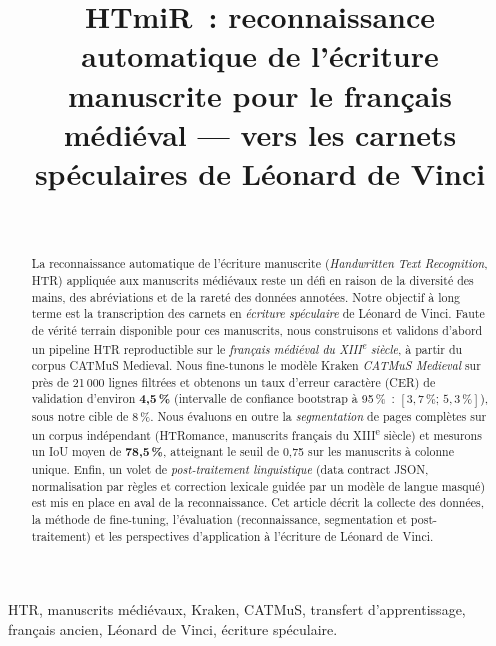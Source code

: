 \documentclass[10pt,journal,a4paper]{IEEEtran}
\begin{document}
\title{HTmiR~: reconnaissance automatique de l'écriture manuscrite pour
le français médiéval --- vers les carnets spéculaires de Léonard de Vinci}

\author{%
\\
%
}

\maketitle

\begin{abstract}
La reconnaissance automatique de l'écriture manuscrite (\textit{Handwritten
Text Recognition}, HTR) appliquée aux manuscrits médiévaux reste un défi en
raison de la diversité des mains, des abréviations et de la rareté des données
annotées. Notre objectif à long terme est la transcription des carnets en
\emph{écriture spéculaire} de Léonard de Vinci. Faute de vérité terrain
disponible pour ces manuscrits, nous construisons et validons d'abord un
pipeline HTR reproductible sur le \emph{français médiéval du
XIII\textsuperscript{e} siècle}, à partir du corpus CATMuS Medieval. Nous
fine-tunons le modèle Kraken \textit{CATMuS Medieval} sur près de 21\,000 lignes
filtrées et obtenons un taux d'erreur caractère (CER) de validation d'environ
\textbf{4,5\,\%} (intervalle de confiance bootstrap à 95\,\%~:
$[3,7\,\%;\,5,3\,\%]$), sous notre cible de 8\,\%. Nous évaluons en outre la
\emph{segmentation} de pages complètes sur un corpus indépendant (HTRomance,
manuscrits français du XIII\textsuperscript{e} siècle) et mesurons un IoU moyen
de \textbf{78,5\,\%}, atteignant le seuil de 0,75 sur les manuscrits à colonne
unique. Enfin, un volet de \emph{post-traitement linguistique} (data contract
JSON, normalisation par règles et correction lexicale guidée par un modèle de
langue masqué) est mis en place en aval de la reconnaissance. Cet article décrit
la collecte des données, la méthode de fine-tuning, l'évaluation (reconnaissance,
segmentation et post-traitement) et les perspectives d'application à l'écriture
de Léonard de Vinci.
\end{abstract}

\begin{IEEEkeywords}
HTR, manuscrits médiévaux, Kraken, CATMuS, transfert d'apprentissage,
français ancien, Léonard de Vinci, écriture spéculaire.
\end{IEEEkeywords}
\end{document}
